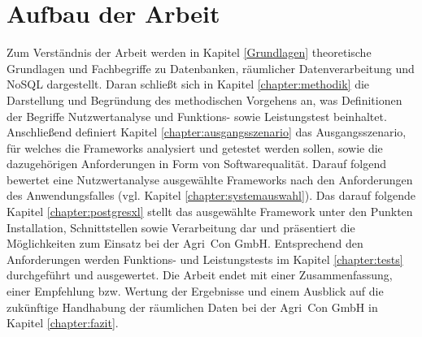 \section{Aufbau der Arbeit}
Zum Verständnis der Arbeit werden in Kapitel \ref{Grundlagen} theoretische Grundlagen und Fachbegriffe zu Datenbanken, räumlicher Datenverarbeitung und NoSQL dargestellt.
Daran schließt sich in Kapitel \ref{chapter:methodik} die Darstellung und Begründung des methodischen Vorgehens an, was Definitionen der Begriffe Nutzwertanalyse und Funktions- sowie Leistungstest beinhaltet.
Anschließend definiert Kapitel \ref{chapter:ausgangsszenario} das Ausgangsszenario, für welches die Frameworks analysiert und getestet werden sollen, sowie die dazugehörigen Anforderungen in Form von Softwarequalität.
Darauf folgend bewertet eine Nutzwertanalyse ausgewählte Frameworks nach den Anforderungen des Anwendungsfalles (vgl. Kapitel \ref{chapter:systemauswahl}).
Das darauf folgende Kapitel \ref{chapter:postgresxl} stellt das ausgewählte Framework unter den Punkten Installation, Schnittstellen sowie Verarbeitung dar und präsentiert die Möglichkeiten zum Einsatz bei der Agri~Con GmbH.
Entsprechend den Anforderungen werden Funktions- und Leistungstests im Kapitel \ref{chapter:tests} durchgeführt und ausgewertet.
Die Arbeit endet mit einer Zusammenfassung, einer Empfehlung bzw. Wertung der Ergebnisse und einem Ausblick auf die zukünftige Handhabung der räumlichen Daten bei der Agri~Con GmbH in Kapitel \ref{chapter:fazit}.


